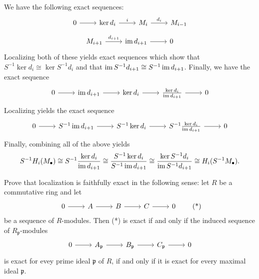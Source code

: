 \documentclass[../../master.tex]{subfiles}
\begin{document}
\begin{solution}
    We have the following exact sequences:
    \[
    \begin{tikzcd}
        0 & \ker d_i & M_i & M_{i-1}
        \arrow[from=1-1, to=1-2]
        \arrow["i", from=1-2, to=1-3]
        \arrow["d_i", from=1-3, to=1-4] 
    \end{tikzcd}
    \] 
    \[
    \begin{tikzcd}
        M_{i+1} & \im d_{i+1} & 0
        \arrow["d_{i+1}", from=1-1, to=1-2]
        \arrow[from=1-2, to=1-3]
    \end{tikzcd}
    \]
    Localizing both of these yields exact sequences which show that $S^{-1} \ker d_i \cong \ker S^{-1} d_i$ and that $\operatorname{im} S^{-1}d_{i+1} \cong S^{-1} \operatorname{im} d_{i+1}$.
    Finally, we have the exact sequence
    \[
    \begin{tikzcd}
        0 & \im d_{i+1} & \ker d_i & \frac{\ker d_i}{\im d_{i+1}} & 0
        \arrow[from=1-1, to=1-2]
        \arrow[from=1-2, to=1-3] 
        \arrow[from=1-3, to=1-4]
        \arrow[from=1-4, to=1-5] 
    \end{tikzcd}
    \]
    Localizing yields the exact sequence
    \[
    \begin{tikzcd}
        0 & S^{-1} \im d_{i+1} & S^{-1} \ker d_i & S^{-1} \frac{\ker d_i}{\im d_{i+1}} & 0
        \arrow[from=1-1, to=1-2]
        \arrow[from=1-2, to=1-3] 
        \arrow[from=1-3, to=1-4]
        \arrow[from=1-4, to=1-5] 
    \end{tikzcd}
    \]
    Finally, combining all of the above yields
    \[
        S^{-1}H_i(M_{\bullet}) \cong S^{-1} \frac{\ker d_i}{\operatorname{im} d_{i+1}} \cong \frac{S^{-1}\ker d_i}{S^{-1} \operatorname{im} d_{i+1}} \cong \frac{\ker S^{-1} d_i}{\operatorname{im} S^{-1} d_{i+1}} \cong H_i(S^{-1} M_{\bullet}).
    \]
\end{solution}

\begin{problem}
    Prove that localization is faithfully exact in the following sense:
    let $R$ be a commutative ring and let
    \[
        \begin{tikzcd}
            0 & A & B & C & 0
            \arrow[from=1-1, to=1-2]
            \arrow[from=1-2, to=1-3]
            \arrow[from=1-3, to=1-4]
            \arrow[from=1-4, to=1-5] 
        \end{tikzcd}\tag{*}
    \]
    be a sequence of $R$-modules.
    Then (*) is exact if and only if the induced sequence of $R_{\mathfrak{p}}$-modules
    \[
        \begin{tikzcd}
            0 & A_{\mathfrak{p}} & B_{\mathfrak{p}} & C_{\mathfrak{p}} & 0
            \arrow[from=1-1, to=1-2]
            \arrow[from=1-2, to=1-3]
            \arrow[from=1-3, to=1-4]
            \arrow[from=1-4, to=1-5] 
        \end{tikzcd}
    \]
    is exact for evey prime ideal $\mathfrak{p}$ of $R$, if and only if it is exact for every maximal ideal $\mathfrak{p}$.
\end{problem}
\end{document}
